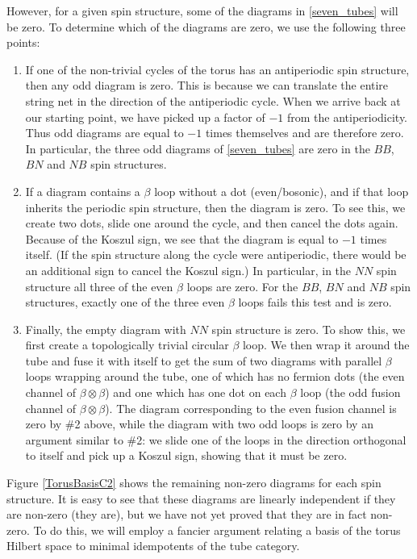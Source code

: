 \documentclass[12pt,a4paper]{article}
\newcommand{\tp}{\otimes}
\begin{document}
However, for a given spin structure, some of the diagrams in \eqref{seven_tubes} will be zero.
To determine which of the diagrams are zero, we use the following three points:
\begin{enumerate}
	\item If one of the non-trivial cycles of the torus has an antiperiodic spin structure, then any odd diagram is zero.
	This is because we can translate the entire string net in the direction of the antiperiodic cycle.
	When we arrive back at our starting point, we have picked up a factor of $-1$ from the antiperiodicity.
	Thus odd diagrams are equal to $-1$ times themselves and are therefore zero.
	In particular, the three odd diagrams of \eqref{seven_tubes} are zero in the $BB$, $BN$ and $NB$ spin structures.
	\item If a diagram contains a $\beta$ loop without a dot (even/bosonic), and if that loop inherits the periodic spin structure,
	then the diagram is zero.
	To see this, we create two dots, slide one around the cycle, and then cancel the dots again.
	Because of the Koszul sign, we see that the diagram is equal to $-1$ times itself.
	(If the spin structure along the cycle were antiperiodic, there would be an additional sign to cancel the Koszul sign.)
	In particular, in the $NN$ spin structure all three of the even $\beta$ loops are zero.
	For the $BB$, $BN$ and $NB$ spin structures, exactly one of the three even $\beta$ loops fails this test and is zero.
	\item Finally, the empty diagram with $NN$ spin structure is zero. To show this, 
	we first create a topologically trivial circular $\beta$ loop. We then wrap it around the tube and fuse it 
	with itself to get the sum of two diagrams with parallel $\beta$ loops wrapping around the tube, one of 
	which has no fermion dots (the even channel of $\beta\tp \beta$) and one which has one dot on each $
	\beta$ loop (the odd fusion channel of $\beta\tp\beta$). 
	The diagram corresponding to the even fusion channel 
	is zero by \#2 above, while the diagram with two odd loops is zero by an argument similar to \#2: we slide one of the loops in the direction
	orthogonal to itself and pick up a Koszul sign, showing that it must be zero.
\end{enumerate}

Figure \ref{TorusBasisC2} shows the remaining non-zero diagrams for each spin structure.
It is easy to see that these diagrams are linearly independent if they are non-zero (they are), but we have not yet proved that they are in fact non-zero.
To do this, we will employ a fancier argument relating a basis of the torus Hilbert space to minimal idempotents of the tube category.
\end{document}
